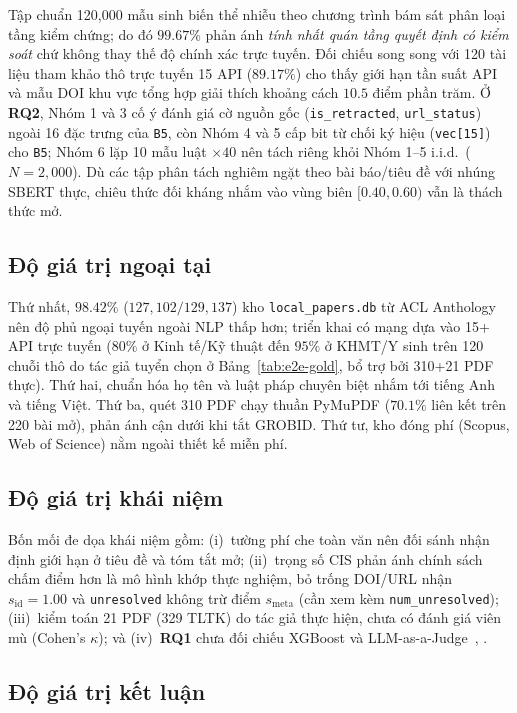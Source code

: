 Tập chuẩn 120,000 mẫu sinh biến thể nhiễu theo chương trình bám sát phân loại tầng kiểm chứng; do đó $99.67\%$ phản ánh \emph{tính nhất quán tầng quyết định có kiểm soát} chứ không thay thế độ chính xác trực tuyến. Đối chiếu song song với 120 tài liệu tham khảo thô trực tuyến 15 API ($89.17\%$) cho thấy giới hạn tần suất API và mẫu DOI khu vực tổng hợp giải thích khoảng cách $10.5$ điểm phần trăm. Ở \textbf{RQ2}, Nhóm 1 và 3 cố ý đánh giá cờ nguồn gốc (\texttt{is\_retracted}, \texttt{url\_status}) ngoài 16 đặc trưng của \texttt{B5}, còn Nhóm 4 và 5 cấp bit từ chối ký hiệu (\texttt{vec[15]}) cho \texttt{B5}; Nhóm 6 lặp 10 mẫu luật $\times 40$ nên tách riêng khỏi Nhóm 1--5 i.i.d.\ ($N=2{,}000$). Dù các tập phân tách nghiêm ngặt theo bài báo/tiêu đề với nhúng SBERT thực, chiêu thức đối kháng nhắm vào vùng biên $[0.40, 0.60)$ vẫn là thách thức mở.

\subsection{Độ giá trị ngoại tại}

Thứ nhất, $98.42\%$ ($127{,}102/129{,}137$) kho \texttt{local\_papers.db} từ ACL Anthology nên độ phủ ngoại tuyến ngoài NLP thấp hơn; triển khai có mạng dựa vào 15+ API trực tuyến ($80\%$ ở Kinh tế/Kỹ thuật đến $95\%$ ở KHMT/Y sinh trên 120 chuỗi thô do tác giả tuyển chọn ở Bảng~\ref{tab:e2e-gold}, bổ trợ bởi 310+21 PDF thực). Thứ hai, chuẩn hóa họ tên và luật pháp chuyên biệt nhắm tới tiếng Anh và tiếng Việt. Thứ ba, quét 310 PDF chạy thuần PyMuPDF ($70.1\%$ liên kết trên 220 bài mở), phản ánh cận dưới khi tắt GROBID. Thứ tư, kho đóng phí (Scopus, Web of Science) nằm ngoài thiết kế miễn phí.

\subsection{Độ giá trị khái niệm}

Bốn mối đe dọa khái niệm gồm: (i)~tường phí che toàn văn nên đối sánh nhận định giới hạn ở tiêu đề và tóm tắt mở; (ii)~trọng số CIS phản ánh chính sách chấm điểm hơn là mô hình khớp thực nghiệm, bỏ trống DOI/URL nhận $s_{\text{id}} = 1.00$ và \texttt{unresolved} không trừ điểm $s_{\text{meta}}$ (cần xem kèm \texttt{num\_unresolved}); (iii)~kiểm toán 21 PDF (329 TLTK) do tác giả thực hiện, chưa có đánh giá viên mù (Cohen's $\kappa$); và (iv)~\textbf{RQ1} chưa đối chiếu XGBoost và LLM-as-a-Judge~\cite{hu2024refchecker}, \cite{press2024citeme}.

\subsection{Độ giá trị kết luận}


